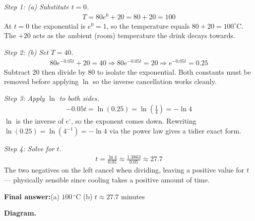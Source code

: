 \documentclass[11pt]{article}
\begin{document}
\textit{Step 1: (a) Substitute \( t = 0 \).}
\[\begin{gathered}
T = 80e^0 + 20 = 80 + 20 = 100
\end{gathered}\]
At \( t = 0 \) the exponential is \( e^0 = 1 \), so the temperature equals \( 80 + 20 = 100^\circ\!\text{C} \). The \( +20 \) acts as the ambient (room) temperature the drink decays towards.

\textit{Step 2: (b) Set \( T = 40 \).}
\[\begin{gathered}
80e^{-0.05t} + 20 = 40 \Rightarrow 80e^{-0.05t} = 20 \Rightarrow e^{-0.05t} = 0.25
\end{gathered}\]
Subtract 20 then divide by 80 to isolate the exponential. Both constants must be removed before applying \( \ln \) so the inverse cancellation works cleanly.

\textit{Step 3: Apply \( \ln \) to both sides.}
\[\begin{gathered}
-0.05t = \ln(0.25) = \ln\!\left(\frac{1}{4}\right) = -\ln 4
\end{gathered}\]
\( \ln \) is the inverse of \( e^{\square} \), so the exponent comes down. Rewriting \( \ln(0.25) = \ln(4^{-1}) = -\ln 4 \) via the power law gives a tidier exact form.

\textit{Step 4: Solve for \( t \).}
\[\begin{gathered}
t = \frac{\ln 4}{0.05} \approx \frac{1.3863}{0.05} \approx 27.7
\end{gathered}\]
The two negatives on the left cancel when dividing, leaving a positive value for \( t \) --- physically sensible since cooling takes a positive amount of time.

\begin{answerbox}
\textbf{Final answer:}\quad (a) \(\displaystyle  100\,^\circ\!\text{C} \) \quad  (b) \(\displaystyle  t \approx 27.7 \) minutes
\end{answerbox}
\textbf{Diagram.}
\end{document}
